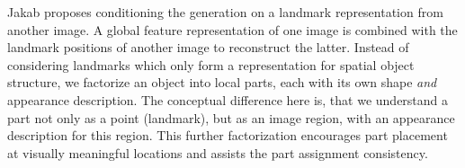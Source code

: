	Jakab \etal \cite{jakab18} proposes conditioning the generation on a landmark representation from another image. A global feature representation of one image is combined with the landmark positions of another image to reconstruct the latter. Instead of considering landmarks which only form a representation for spatial object structure, we factorize an object into local parts, each with its own shape \textit{and} appearance description.
	The conceptual difference here is, that we understand a part not only as a point (landmark), but as an image region, with an appearance description for this region. This further factorization encourages part placement at visually meaningful locations and assists the part assignment consistency.
%
%
